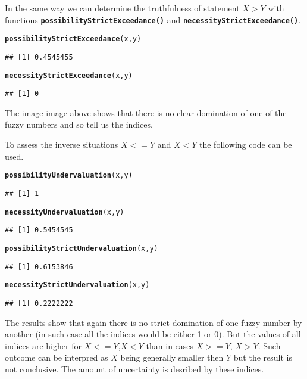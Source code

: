 \documentclass[11pt]{article}\usepackage[]{graphicx}\usepackage[]{color}
\makeatletter
\newcommand{\hlstd}[1]{\textcolor[rgb]{0.345,0.345,0.345}{#1}}%
\newcommand{\hlkwd}[1]{\textcolor[rgb]{0.737,0.353,0.396}{\textbf{#1}}}%
\newenvironment{kframe}{%
 \def\at@end@of@kframe{}%
 \ifinner\ifhmode%
  \def\at@end@of@kframe{\end{minipage}}%
  \begin{minipage}{\columnwidth}%
 \fi\fi%
 \def\FrameCommand##1{\hskip\@totalleftmargin \hskip-\fboxsep
 \colorbox{shadecolor}{##1}\hskip-\fboxsep
     \hskip-\linewidth \hskip-\@totalleftmargin \hskip\columnwidth}%
 \MakeFramed {\advance\hsize-\width
   \@totalleftmargin\z@ \linewidth\hsize
   \@setminipage}}%
 {\par\unskip\endMakeFramed%
 \at@end@of@kframe}
\newenvironment{knitrout}{}{} %
\newcommand{\func}[1]{\texttt{\hlkwd{#1}}}
\makeatother
\begin{document}
In the same way we can determine the truthfulness of statement $X>Y$ with functions \func{possibilityStrictExceedance()} and \func{necessityStrictExceedance()}.
\begin{knitrout}\small
{}\color{fgcolor}\begin{kframe}
\begin{alltt}
\hlkwd{possibilityStrictExceedance}\hlstd{(x,y)}
\end{alltt}
\begin{verbatim}
## [1] 0.4545455
\end{verbatim}
\begin{alltt}
\hlkwd{necessityStrictExceedance}\hlstd{(x,y)}
\end{alltt}
\begin{verbatim}
## [1] 0
\end{verbatim}
\end{kframe}
\end{knitrout}
The image image above shows that there is no clear domination of one of the fuzzy numbers and so tell us the indices.

To assess the inverse situations $X<=Y$ and $X<Y$ the following code can be used.
\begin{knitrout}\small
{}\color{fgcolor}\begin{kframe}
\begin{alltt}
\hlkwd{possibilityUndervaluation}\hlstd{(x,y)}
\end{alltt}
\begin{verbatim}
## [1] 1
\end{verbatim}
\begin{alltt}
\hlkwd{necessityUndervaluation}\hlstd{(x,y)}
\end{alltt}
\begin{verbatim}
## [1] 0.5454545
\end{verbatim}
\begin{alltt}
\hlkwd{possibilityStrictUndervaluation}\hlstd{(x,y)}
\end{alltt}
\begin{verbatim}
## [1] 0.6153846
\end{verbatim}
\begin{alltt}
\hlkwd{necessityStrictUndervaluation}\hlstd{(x,y)}
\end{alltt}
\begin{verbatim}
## [1] 0.2222222
\end{verbatim}
\end{kframe}
\end{knitrout}
The results show that again there is no strict domination of one fuzzy number by another (in such case all the indices would be either 1 or 0). But the values of all indices are higher for $X<=Y$,$X<Y$ than in cases $X>=Y$, $X>Y$. Such outcome can be interpred as $X$ being generally smaller then $Y$ but the result is not conclusive. The amount of uncertainty is desribed by these indices.
\end{document}
